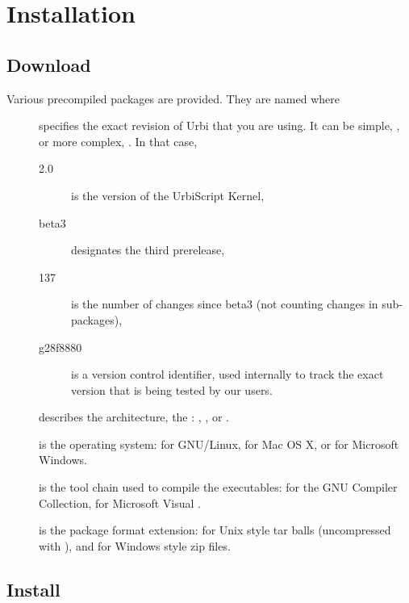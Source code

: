 \chapter{Installation}
\label{sec:installation}

\section{Download}

Various precompiled packages are provided.  They are named
 where
\begin{description}
\item[] specifies the exact revision of Urbi that you are
  using.  It can be simple, , or more complex,
  .  In that case,
  \begin{description}
  \item[2.0] is the version of the UrbiScript Kernel,
  \item[beta3] designates the third prerelease,
  \item[137] is the number of changes since beta3 (not counting
    changes in sub-packages),
  \item[g28f8880] is a version control identifier, used internally to
    track the exact version that is being tested by our users.
  \end{description}
\item[] describes the architecture, the :
  , , or .
\item[] is the operating system:  for GNU/Linux,
   for Mac OS X, or  for Microsoft Windows.
\item[] is the tool chain used to compile the
  executables:  for the GNU Compiler Collection, 
  for Microsoft Visual \Cxx.
\item[] is the package format extension:  for
  Unix style tar balls (uncompressed with ), and  for Windows style zip files.
\end{description}

\section{Install}

